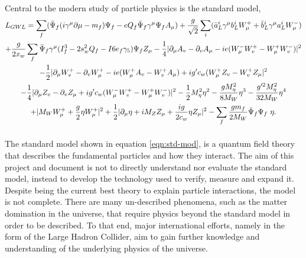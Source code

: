     Central to the modern study of particle physics is the standard model,
    \begin{multline} \label{eqn:std-mod}
      L_{GWL} = \sum_{f} ( \bar{\Psi}_{f} ( i \gamma^\mu \partial \mu - m_{f} ) \Psi_{f} - eQ_{f} \bar{\Psi}_{f} \gamma^\mu \Psi_{f} A_{\mu} ) + \frac{g}{\sqrt{2}} \sum_{i} ( \bar{a}^i_L \gamma^\mu b^i_L W^+_\mu + \bar{b}^i_L \gamma^\mu a^i_L W^-_\mu )                        \\                           
              + \frac{g}{2x_w} \sum_f \bar{\Psi}_f \gamma^\mu ( I^3_f - 2s^2_w Q_f - I6e_f \gamma_5 ) \Psi_f Z_\mu - \frac{1}{4} | \partial_\mu A_v - \partial_v A_\mu - ie(W^-_\mu W^+_v - W^+_\mu W^-_v ) |^2                                         \\                                     
              - \frac{1}{2} | \partial_\mu W^+_v - \partial_v W^+_\mu - ie ( W^+_\mu A_v - W^+_v A_\mu ) + ig' c_w (W^+_\mu Z_v - W^+_v Z_\mu |^2 \\
              - \frac{1}{4} | \partial_\mu Z_v - \partial_v Z_\mu + ig' c_w (W^-_\mu W^+_v - W^+_\mu W^-_v ) |^2 - \frac{1}{2} M^2_\eta \eta^2  - \frac{gM^2_\eta}{8M_W} \eta^3  - \frac{g'^2 M^2_\eta}{32M_W}\eta^4    \\     
              + | M_W W^+_\mu + \frac{g}{2} \eta W^+_\mu |^2 + \frac{1}{2} | \partial_\mu \eta + i M_Z Z_\mu + \frac{ig}{2c_w} \eta Z_\mu |^2 - \sum_f \frac{g m_f}{2 M_W} \bar{\Psi}_f \Psi_f\ \eta. 
              \vspace{1em}                                                                               
    \end{multline}
    The standard model shown in equation \ref{eqn:std-mod}, is a quantum field theory that describes the fundamental particles and how they interact.
    The aim of this project and document is not to directly understand nor evaluate the standard model, instead to develop the technology used to verify, measure and expand it.
    Despite being the current best theory to explain particle interactions, the model is not complete.
    There are many un-described phenomena, such as the matter domination in the universe, that require physics beyond the standard model in order to be described.
    To that end, major international efforts, namely in the form of the Large Hadron Collider, aim to gain further knowledge and understanding of the underlying physics of the universe. \cite{ref:std}

